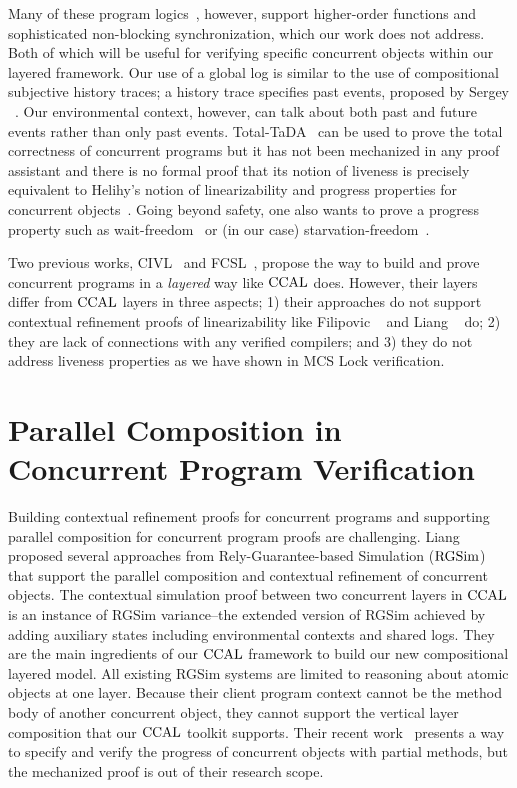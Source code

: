 Many of these program logics~\cite{Turon13popl,iris15}, however, support 
higher-order functions 
and sophisticated non-blocking synchronization,
which our work does not address.
Both of which will be
useful for verifying specific concurrent objects within our layered
framework. 
Our use of a global log is similar to the use of compositional
subjective history traces; a history trace specifies past events, proposed by Sergey \etal~\cite{sergey15}.
Our environmental context, however, can talk about both past and future events rather than only past events.
Total-TaDA~\cite{pinto16} can be used to prove
the total correctness of concurrent programs but it has not been
mechanized in any proof assistant and there is no formal proof that
its notion of liveness is precisely equivalent to Helihy's notion of
linearizability and progress properties for concurrent
objects~\cite{Herlihy08book}. 
Going
beyond safety, one also wants to prove a progress property such as
wait-freedom~\cite{herlihy91:waitfree} or (in our case)
starvation-freedom~\cite{Herlihy08book}.

Two previous works, CIVL~\cite{civl15} and FCSL~\cite{sergey15pldi},
propose the way to build and prove concurrent programs in a \textit{layered} way like $\mathrm{CCAL}$ does. 
However, their layers differ from $\mathrm{CCAL}$ layers in three aspects;
1) their approaches do not support contextual refinement proofs of linearizability like Filipovic \etal~\cite{filipovic10} and Liang \etal~\cite{liang13} do;
2) they are lack of connections with any verified compilers; and
3) they do not address liveness properties as we have shown in MCS Lock verification.



\section{Parallel Composition in Concurrent Program Verification}
\label{chatper:related:sec:parallel-composition-in-concurrent-program-verification}

Building contextual refinement proofs for concurrent programs and supporting parallel composition for concurrent program proofs 
are challenging.
Liang \etal~\cite{RGSim,Liang14lics,lili16, liang:2017} 
proposed several approaches from Rely-Guarantee-based Simulation ($\mathrm{RGSim}$) 
that support the parallel
composition and  contextual refinement of concurrent
objects.
The contextual simulation proof between two concurrent layers in $\mathrm{CCAL}$ is an instance of RGSim variance--the extended version of RGSim achieved by adding auxiliary states including environmental contexts and shared logs. 
They are the main ingredients of our $\mathrm{CCAL}$ framework 
to build our new  compositional
layered model.
All existing RGSim systems are limited to reasoning
about atomic objects at one layer.
Because their client program context cannot 
be the method body of another concurrent object, 
they cannot
support the vertical layer composition that our $\mathrm{CCAL}$ toolkit supports.
Their recent work~\cite{liang:2017} presents a way to specify and verify the progress of concurrent objects with partial methods, but the mechanized proof is out of their research scope. 


